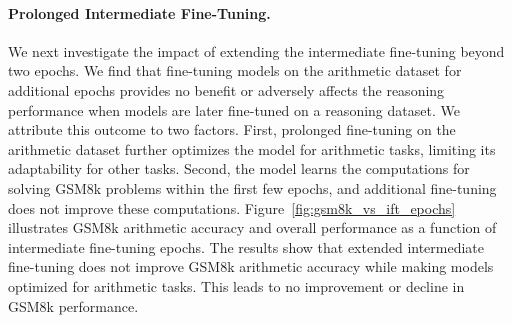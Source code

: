 \paragraph{Prolonged Intermediate Fine-Tuning.}
We next investigate the impact of extending the intermediate fine-tuning beyond two epochs. We find that fine-tuning models on the arithmetic dataset for additional epochs provides no benefit or adversely affects the reasoning performance when models are later fine-tuned on a reasoning dataset. We attribute this outcome to two factors. First, prolonged fine-tuning on the arithmetic dataset further optimizes the model for arithmetic tasks, limiting its adaptability for other tasks. Second, the model learns the computations for solving GSM8k problems within the first few epochs, and additional fine-tuning does not improve these computations. Figure~\ref{fig:gsm8k_vs_ift_epochs} illustrates GSM8k arithmetic accuracy and overall performance as a function of intermediate fine-tuning epochs. The results show that extended intermediate fine-tuning does not improve GSM8k arithmetic accuracy while making models optimized for arithmetic tasks. This leads to no improvement or decline in GSM8k performance.


